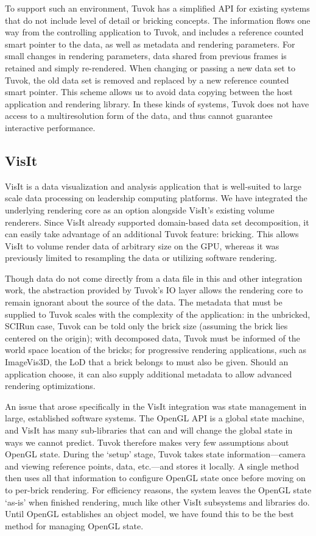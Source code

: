 To support such an environment, Tuvok has a simplified
API for existing systems that do not include level of detail
or bricking concepts. The information flows one way from
the controlling application to Tuvok, and includes a reference
counted smart pointer to the data, as well as metadata
and rendering parameters. For small changes in rendering
parameters, data shared from previous frames is retained and
simply re-rendered. When changing or passing a new data
set to Tuvok, the old data set is removed and replaced by
a new reference counted smart pointer. This scheme allows
us to avoid data copying between the host application and
rendering library. In these kinds of systems, Tuvok does not
have access to a multiresolution form of the data, and thus
cannot guarantee interactive performance.

\subsection{VisIt}

VisIt is a data visualization and analysis application that is
well-suited to large scale data processing on leadership computing
platforms. We have integrated the underlying rendering
core as an option alongside VisIt's existing volume renderers.
Since VisIt already supported domain-based data set
decomposition, it can easily take advantage of an additional
Tuvok feature: bricking. This allows VisIt to volume render
data of arbitrary size on the GPU, whereas it was previously
limited to resampling the data or utilizing software rendering.

Though data do not come directly from a data file in this
and other integration work, the abstraction provided by Tuvok's
IO layer allows the rendering core to remain ignorant
about the source of the data. The metadata that must be
supplied to Tuvok scales with the complexity of the application:
in the unbricked, SCIRun case, Tuvok can be told only
the brick size (assuming the brick lies centered on the origin);
with decomposed data, Tuvok must be informed of the
world space location of the bricks; for progressive rendering
applications, such as ImageVis3D, the LoD that a brick belongs
to must also be given. Should an application choose, it
can also supply additional metadata to allow advanced rendering
optimizations.

An issue that arose specifically in the VisIt integration
was state management in large, established software systems.
The OpenGL API is a global state machine, and VisIt
has many sub-libraries that can and will change the global
state in ways we cannot predict. Tuvok therefore makes very
few assumptions about OpenGL state. During the `setup'
stage, Tuvok takes state information---camera and viewing
reference points, data, etc.---and stores it locally.
A single method then uses all that information to configure
OpenGL state once before moving on to per-brick rendering.
For efficiency reasons, the system leaves the OpenGL
state `as-is' when finished rendering, much like other VisIt
subsystems and libraries do. Until OpenGL establishes an
object model, we have found this to be the best method for
managing OpenGL state.

